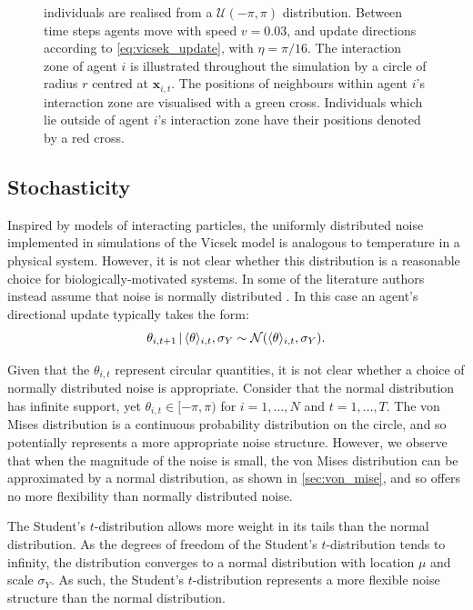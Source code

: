\begin{figure}[tb]
{    individuals are realised from a $\mathcal{U}(-\pi, \pi)$ distribution.
    Between time steps agents move with speed $v=0.03$, and update
    directions according to \cref{eq:vicsek_update}, with $\eta=\pi/16$.
    The interaction zone of agent $i$ is illustrated throughout the
    simulation by a circle of radius $r$ centred at $\bm{x}_{i,t}$. The
    positions of neighbours within agent $i$'s interaction zone are
    visualised with a green cross. Individuals which lie outside of agent
    $i$'s interaction zone have their positions denoted by a red cross.}
  \label{fig:vicsek_illustration}
\end{figure}

\subsection{Stochasticity}

Inspired by models of interacting particles, the uniformly distributed noise
implemented in simulations of the Vicsek model is analogous to temperature in a
physical system. However, it is not clear whether this distribution is a
reasonable choice for biologically-motivated systems. In some of the literature
authors instead assume that noise is normally distributed \parencite{couzin02}.
In this case an agent's directional update typically takes the form:
\begin{equation*}
  \label{eq:normal_update}
  \theta_{i,t+1} \,|\, \langle\theta\rangle_{i,t}, \sigma_Y \sim
      \mathcal{N}(\langle\theta\rangle_{i,t}, \sigma_Y).
\end{equation*}

Given that the $\theta_{i,t}$ represent circular quantities, it is not clear
whether a choice of normally distributed noise is appropriate. Consider that
the normal distribution has infinite support, yet $\theta_{i,t}\in[-\pi,\pi)$
for $i=1,\ldots,N$ and $t=1,\ldots,T$. The von Mises distribution is a
continuous probability distribution on the circle, and so potentially
represents a more appropriate noise structure. However, we observe that when
the magnitude of the noise is small, the von Mises distribution can be
approximated by a normal distribution, as shown in \cref{sec:von_mise}, and so
offers no more flexibility than normally distributed noise.

The Student's $t$-distribution allows more weight in its tails than the normal
distribution. As the degrees of freedom of the Student's $t$-distribution tends
to infinity, the distribution converges to a normal distribution with location
$\mu$ and scale $\sigma_Y$. As such, the Student's $t$-distribution represents
a more flexible noise structure than the normal distribution.

